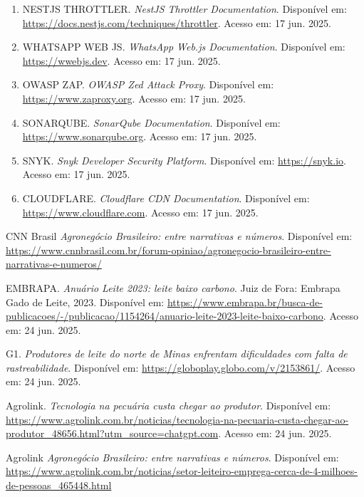 \documentclass[12pt, a4paper]{article}
\begin{document}
\begin{spacing}{1.5}
\begin{spacing}{1.5}
\begin{enumerate}
    \item NESTJS THROTTLER. \textit{NestJS Throttler Documentation}. Disponível em: \url{https://docs.nestjs.com/techniques/throttler}. Acesso em: 17 jun. 2025.
    \item WHATSAPP WEB JS. \textit{WhatsApp Web.js Documentation}. Disponível em: \url{https://wwebjs.dev}. Acesso em: 17 jun. 2025.
    \item OWASP ZAP. \textit{OWASP Zed Attack Proxy}. Disponível em: \url{https://www.zaproxy.org}. Acesso em: 17 jun. 2025.
    \item SONARQUBE. \textit{SonarQube Documentation}. Disponível em: \url{https://www.sonarqube.org}. Acesso em: 17 jun. 2025.
    \item SNYK. \textit{Snyk Developer Security Platform}. Disponível em: \url{https://snyk.io}. Acesso em: 17 jun. 2025.
    \item CLOUDFLARE. \textit{Cloudflare CDN Documentation}. Disponível em: \url{https://www.cloudflare.com}. Acesso em: 17 jun. 2025.

\end{enumerate}


\begin{thebibliography}{99}

CNN Brasil \textit{Agronegócio Brasileiro: entre narrativas e números}. Disponível em: \url{https://www.cnnbrasil.com.br/forum-opiniao/agronegocio-brasileiro-entre-narrativas-e-numeros/}

EMBRAPA. \textit{Anuário Leite 2023: leite baixo carbono}. Juiz de Fora: Embrapa Gado de Leite, 2023. Disponível em: \url{https://www.embrapa.br/busca-de-publicacoes/-/publicacao/1154264/anuario-leite-2023-leite-baixo-carbono}. Acesso em: 24 jun. 2025.

G1. \textit{Produtores de leite do norte de Minas enfrentam dificuldades com falta de rastreabilidade}. Disponível em: \url{https://globoplay.globo.com/v/2153861/}. Acesso em: 24 jun. 2025.

Agrolink. \textit{Tecnologia na pecuária custa chegar ao produtor}. Disponível em: \url{https://www.agrolink.com.br/noticias/tecnologia-na-pecuaria-custa-chegar-ao-produtor_48656.html?utm_source=chatgpt.com}. Acesso em: 24 jun. 2025.

Agrolink \textit{Agronegócio Brasileiro: entre narrativas e números}. Disponível em: \url{https://www.agrolink.com.br/noticias/setor-leiteiro-emprega-cerca-de-4-milhoes-de-pessoas_465448.html}


\end{thebibliography}
\end{spacing}
\end{spacing}
\end{document}
